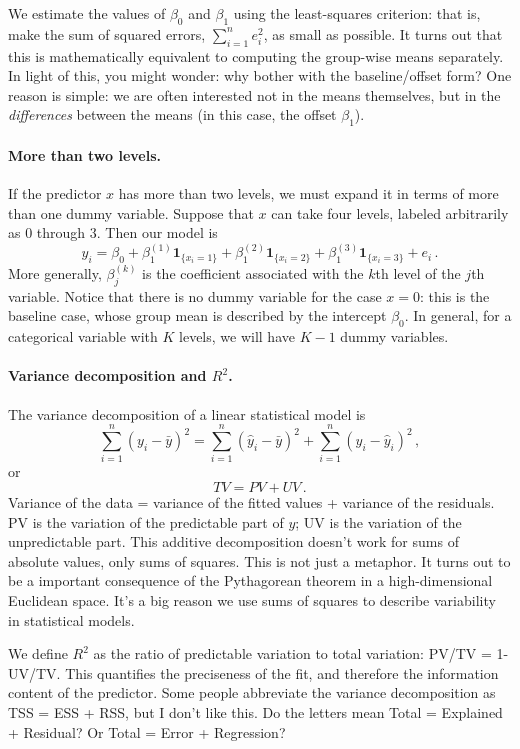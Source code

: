 \documentclass[11pt]{article}
\newcommand{\1}[1]{\mathbf{1}_{\{ {#1} \}}}
\begin{document}
We estimate the values of $\beta_0$ and $\beta_1$ using the least-squares criterion: that is, make the sum of squared errors, $\sum_{i=1}^n e_i^2$, as small as possible.  It turns out that this is mathematically equivalent to computing the group-wise means separately.  In light of this, you might wonder: why bother with the baseline/offset form? One reason is simple: we are often interested not in the means themselves, but in 
the \textit{differences} between the means (in this case, the offset $\beta_1$).


\paragraph{More than two levels.}

If the predictor $x$ has more than two levels, we must expand it in terms of more than one dummy variable.  Suppose that $x$ can take four levels, labeled arbitrarily as $0$ through $3$.  Then our model is
$$
y_i = \beta_0 + \beta_1^{(1)} \1{x_i=1} + \beta_1^{(2)} \1{x_i=2} + \beta_1^{(3)} \1{x_i=3} + e_i \, .
$$
More generally, $\beta_j^{(k)}$ is the coefficient associated with the $k$th level of the $j$th variable.  Notice that there is no dummy variable for the case $x = 0$: this is the baseline case, whose group mean is described by the intercept $\beta_0$.  In general, for a categorical variable with $K$ levels, we will have $K-1$ dummy variables.

\paragraph{Variance decomposition and $R^2$.}

The variance decomposition of a linear statistical model is
$$
\sum_{i=1}^n (y_i - \bar{y})^2 = \sum_{i=1}^n (\hat{y}_i - \bar{y})^2 + \sum_{i=1}^n (y_i - \hat{y}_i)^2 \, ,
$$
or
$$
TV = PV + UV \, .
$$
Variance of the data = variance of the fitted values + variance of the residuals.  PV is the variation of the predictable part of $y$; UV is the variation of the unpredictable part.  This additive decomposition doesn't work for sums of absolute values, only sums of squares.  This is not just a metaphor.  It turns out to be a important consequence of the Pythagorean theorem in a high-dimensional Euclidean space.  It's a big reason we use sums of squares to describe variability in statistical models.

We define $R^2$ as the ratio of predictable variation to total variation: PV/TV = 1-UV/TV.  This quantifies the preciseness of the fit, and therefore the information content of the predictor.  Some people abbreviate the variance decomposition as TSS = ESS + RSS, but I don't like this.  Do the letters mean Total = Explained + Residual?  Or Total = Error + Regression?
\end{document}
